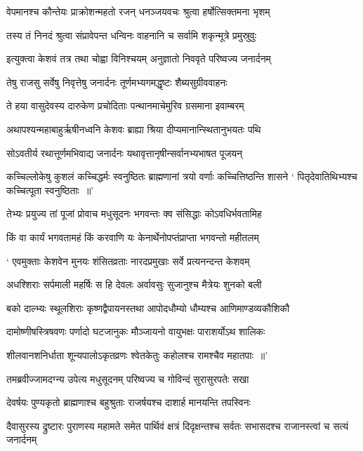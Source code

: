 \twolineshloka
{वेपमानश्च कौन्तेयः प्राक्रोशन्महतो रजन्}
{धनञ्जयवचः श्रुत्वा हर्षोत्सिक्तमना भृशम्}


\twolineshloka
{तस्य तं निनदं श्रुत्वा संप्रावेपन्त धन्विनः}
{वाहनानि च सर्वामि शकृन्मूत्रे प्रमुस्रुवुः}


\twolineshloka
{इत्युक्त्वा केशवं तत्र तथा चोह्वा विनिश्चयम्}
{अनुज्ञातो निववृते परिष्वज्य जनार्दनम्}


\twolineshloka
{तेषु राजसु सर्वेषु निवृत्तेषु जनार्दनः}
{तूर्णमभ्यगमद्धृष्टः शैब्यसुग्रीववाहनः}


\twolineshloka
{ते हया वासुदेवस्य दारुकेण प्रचोदिताः}
{पन्थानमाचेमुरिव ग्रसमाना इवाम्बरम्}


\twolineshloka
{अथापश्यन्महाबाहुर्ऋषीनध्वनि केशवः}
{ब्राह्या श्रिया दीप्यमानान्स्थितानुभयतः पथि}


\twolineshloka
{सोऽवतीर्य रथात्तूर्णमभिवाद्य जनार्दनः}
{यथावृत्तानृषीन्सर्वानभ्यभाषत पूजयन्}


\threelineshloka
{कच्चिल्लोकेषु कुशलं कच्चिद्धर्मः स्वनुष्ठितः}
{ब्राह्मणानां त्रयो वर्णाः कच्चित्तिष्ठन्ति शासने}
{` पितृदेवातिथिभ्यश्च कच्चित्पूता स्वनुष्ठिताः ॥'}


\twolineshloka
{तेभ्यः प्रयुज्य तां पूजां प्रोवाच मधुसूदनः}
{भगवन्तः क्व संसिद्धाः कोऽवधिर्भवतामिह}


\twolineshloka
{किं वा कार्यं भगवतामहं किं करवाणि यः}
{केनार्थेनोपप्तंप्राप्ता भगवन्तो महीतलम्}


\twolineshloka
{` एवमुक्ताः केशवेन मुनयः शंसितव्रताः}
{नारदप्रमुखाः सर्वे प्रत्यनन्दन्त केशवम्}


\twolineshloka
{अधश्शिराः सर्पमाली महर्षिः स हि देवलः}
{अर्वावसुः सुजानुश्च मैत्रेयः शुनको बली}


\twolineshloka
{बको दाल्भ्यः स्थूलशिराः कृष्णद्वैपायनस्तथा}
{आपोदधौम्यो धौम्यश्च आणिमाण्डव्यकौशिकौ}


\twolineshloka
{दामोष्णीषस्त्रिषवणः पर्णादो घटजानुकः}
{मौञ्जायनो वायुभक्षः पाराशर्योऽथ शालिकः}


\twolineshloka
{शीलवानशनिर्धाता शून्यपालोऽकृतव्रणः}
{श्वेतकेतुः कहोलश्च रामश्चैव महातपाः ॥'}


\twolineshloka
{तमब्रवीज्जामदग्न्य उपेत्य मधुसूदनम्}
{परिष्वज्य च गोविन्दं सुरासुरपतेः सखा}


\twolineshloka
{देवर्षयः पुण्यकृतो ब्राह्मणाश्च बहुश्रुताः}
{राजर्षयश्च दाशार्ह मानयन्ति तपस्विनः}


\threelineshloka
{दैवासुरस्य द्रुष्टारः पुराणस्य महामते}
{समेत पार्थिवं क्षत्रं दिदृक्षन्तश्च सर्वतः}
{सभासदश्च राजानस्त्वां च सत्यं जनार्दनम्}


